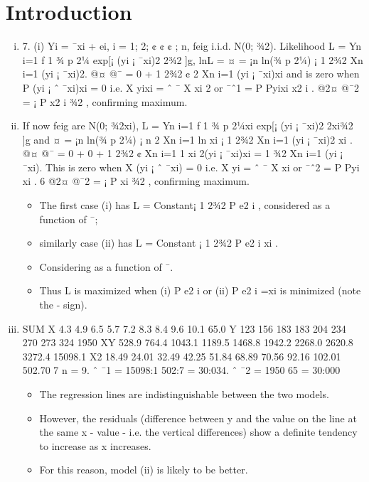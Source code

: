 \documentclass[a4paper,12pt]{article}
\begin{document}
\section{Introduction}
\begin{enumerate}[(i)]
\item 7. (i) Yi = ¯xi + ei, i = 1; 2; ¢ ¢ ¢ ; n, feig i.i.d. N(0; ¾2).
Likelihood L =
Yn
i=1
f
1
¾
p
2¼
exp[¡
(yi ¡ ¯xi)2
2¾2 ]g,
lnL = ¤ = ¡n ln(¾
p
2¼) ¡ 1
2¾2
Xn
i=1
(yi ¡ ¯xi)2.
@¤
@¯
= 0 +
1
2¾2
¢ 2
Xn
i=1
(yi ¡ ¯xi)xi and is zero when
P
(yi ¡ ˆ ¯xi)xi = 0 i.e.
X
yixi = ˆ ¯
X
xi
2 or ¯ˆ1 =
P
Pyixi
x2
i
.
@2¤
@¯2 = ¡
P
x2
i
¾2 , confirming maximum.

\item  If now feig are N(0; ¾2xi),
L =
Yn
i=1
f
1
¾
p
2¼xi
exp[¡
(yi ¡ ¯xi)2
2xi¾2 ]g
and ¤ = ¡n ln(¾
p
2¼) ¡ n
2
Xn
i=1
ln xi ¡
1
2¾2
Xn
i=1
(yi ¡ ¯xi)2
xi
.
@¤
@¯
= 0 + 0 +
1
2¾2
¢
Xn
i=1
1
xi
2(yi ¡ ¯xi)xi =
1
¾2
Xn
i=1
(yi ¡ ¯xi).
This is zero when
X
(yi ¡ ˆ ¯xi) = 0 i.e.
X
yi = ˆ ¯
X
xi or ¯ˆ2 =
P
Pyi
xi
.
6
@2¤
@¯2 = ¡
P
xi
¾2 , confirming maximum.
\begin{itemize}
\item The first case (i) has L = Constant¡ 1
2¾2
P
e2
i , considered as a function of ¯;
\item similarly case (ii) has L = Constant ¡ 1
2¾2
P e2
i
xi
. 
\item Considering as a function
of ¯. 
\item Thus L is maximized when (i)
P
e2
i or (ii)
P
e2
i =xi is minimized (note
the - sign).
\end{itemize}
\item 
SUM
X 4.3 4.9 6.5 5.7 7.2 8.3 8.4 9.6 10.1 65.0
Y 123 156 183 183 204 234 270 273 324 1950
XY 528.9 764.4 1043.1 1189.5 1468.8 1942.2 2268.0 2620.8 3272.4 15098.1
X2 18.49 24.01 32.49 42.25 51.84 68.89 70.56 92.16 102.01 502.70
7
n = 9. ˆ ¯1 = 15098:1
502:7 = 30:034. ˆ ¯2 = 1950
65 = 30:000

\begin{itemize}
\item The regression lines are indistinguishable between the two models. 
\item However,
the residuals (difference between y and the value on the line at the same x
- value - i.e. the vertical differences) show a definite tendency to increase as
x increases.
\item For this reason, model (ii) is likely to be better.
\end{itemize}
\end{enumerate}
\end{document}
